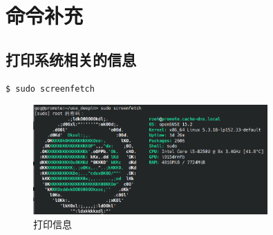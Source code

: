 
\chapter{命令补充}
\section{打印系统相关的信息}

\begin{lstlisting}
$ sudo screenfetch
\end{lstlisting}

\begin{figure}[htp]  
    \centering
    \includegraphics[width=0.8\textwidth]{./img/screenfetch.png} %
    \caption{打印信息} %
    \label{screenfetch} %
\end{figure}